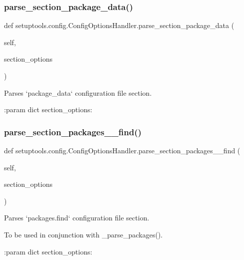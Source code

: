 \subsubsection{\texorpdfstring{parse\+\_\+section\+\_\+package\+\_\+data()}{parse\_section\_package\_data()}}
{\footnotesize\ttfamily def setuptools.\+config.\+Config\+Options\+Handler.\+parse\+\_\+section\+\_\+package\+\_\+data (\begin{DoxyParamCaption}\item[{}]{self,  }\item[{}]{section\+\_\+options }\end{DoxyParamCaption})}

\begin{DoxyVerb}Parses `package_data` configuration file section.

:param dict section_options:
\end{DoxyVerb}
 \mbox{\label{classsetuptools_1_1config_1_1_config_options_handler_afed6ee3f1ec81344d74bdf4628e4c46c}} 
\subsubsection{\texorpdfstring{parse\+\_\+section\+\_\+packages\+\_\+\+\_\+find()}{parse\_section\_packages\_\_find()}}
{\footnotesize\ttfamily def setuptools.\+config.\+Config\+Options\+Handler.\+parse\+\_\+section\+\_\+packages\+\_\+\+\_\+find (\begin{DoxyParamCaption}\item[{}]{self,  }\item[{}]{section\+\_\+options }\end{DoxyParamCaption})}

\begin{DoxyVerb}Parses `packages.find` configuration file section.

To be used in conjunction with _parse_packages().

:param dict section_options:
\end{DoxyVerb}
 \mbox{\label{classsetuptools_1_1config_1_1_config_options_handler_a84db64d7a8a64c2816c2967a1ba1a486}} 
